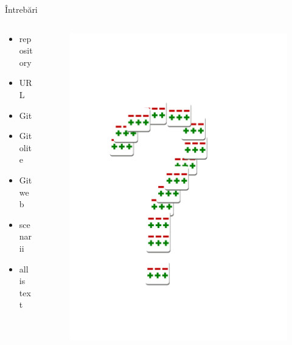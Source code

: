 \documentclass{simple}
\begin{document}
\begin{frame}{Întrebări}
	\begin{columns}
		\begin{column}{0.5\textwidth}
			\begin{itemize}
				\item repository
                \item URL
                \item Git
                \item Gitolite
                \item Gitweb
                \item scenarii
                \item all is text
			\end{itemize}
		\end{column}
		\begin{column}{0.5\textwidth}
			\begin{figure}
				\centering
				\includegraphics[width=0.5\columnwidth]{img/question-mark}
			\end{figure}
		\end{column}
	\end{columns}
\end{frame}
\end{document}
